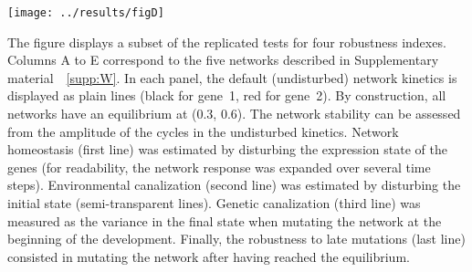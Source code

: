 \documentclass{article}
\newcommand{\SupMat}{Supplementary material~}
\begin{document}
\begin{appendices}
	\texttt{[image: ../results/figD]}
	
	The figure displays a subset of the replicated tests for four robustness indexes. Columns A to E correspond to the five networks described in \SupMat~\ref{supp:W}. In each panel, the default (undisturbed) network kinetics is displayed as plain lines (black for gene~1, red for gene~2). By construction, all networks have an equilibrium at (0.3, 0.6). The network stability can be assessed from the amplitude of the cycles in the undisturbed kinetics. Network homeostasis (first line) was estimated by disturbing the expression state of the genes (for readability, the network response was expanded over several time steps). Environmental canalization (second line) was estimated by disturbing the initial state (semi-transparent lines). Genetic canalization (third line) was measured as the variance in the final state when mutating the network at the beginning of the development. Finally, the robustness to late mutations (last line) consisted in mutating the network after having reached the equilibrium.

\end{appendices}
\end{document}
